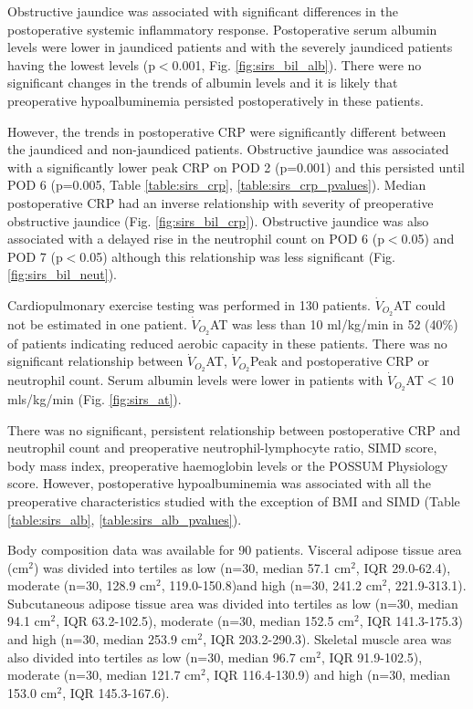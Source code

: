 Obstructive jaundice was associated with significant differences in the postoperative systemic inflammatory response. 
Postoperative serum albumin levels were lower in jaundiced patients and with the severely jaundiced patients having the lowest levels (p$<$0.001, Fig. \ref{fig:sirs_bil_alb}). 
There were no significant changes in the trends of albumin levels and it is likely that preoperative hypoalbuminemia persisted postoperatively in these patients. 

However, the trends in postoperative CRP were significantly different between the jaundiced and non-jaundiced patients. 
Obstructive jaundice was associated with a significantly lower peak CRP on POD 2 (p=0.001) and this persisted until POD 6 (p=0.005, Table \ref{table:sirs_crp}, \ref{table:sirs_crp_pvalues}).
Median postoperative CRP had an inverse relationship with severity of preoperative obstructive jaundice (Fig. \ref{fig:sirs_bil_crp}).
Obstructive jaundice was also associated with a delayed rise in the neutrophil count on POD 6 (p$<$0.05) and POD 7 (p$<$0.05) although this relationship was less significant (Fig. \ref{fig:sirs_bil_neut}). 

Cardiopulmonary exercise testing was performed in 130 patients. 
$\dot{V}_{O_2}$AT could not be estimated in one patient.
$\dot{V}_{O_2}$AT was less than 10 ml/kg/min in 52 (40\%) of patients indicating reduced aerobic capacity in these patients.
There was no significant relationship between $\dot{V}_{O_2}$AT, $\dot{V}_{O_2}$Peak and postoperative CRP or neutrophil count. 
Serum albumin levels were lower in patients with $\dot{V}_{O_2}$AT$<$10 mls/kg/min (Fig. \ref{fig:sirs_at}).

There was no significant, persistent relationship between postoperative CRP and neutrophil count and preoperative neutrophil-lymphocyte ratio, SIMD score, body mass index, preoperative haemoglobin levels or the POSSUM Physiology score. 
However, postoperative hypoalbuminemia was associated with all the preoperative characteristics studied with the exception of BMI and SIMD (Table \ref{table:sirs_alb}, \ref{table:sirs_alb_pvalues}).

Body composition data was available for 90 patients.
Visceral adipose tissue area (cm$^2$) was divided into tertiles as low (n=30, median 57.1 cm$^2$, IQR 29.0-62.4), moderate (n=30, 128.9 cm$^2$, 119.0-150.8)and high (n=30, 241.2 cm$^2$, 221.9-313.1). 
Subcutaneous adipose tissue area was divided into tertiles as low (n=30, median 94.1 cm$^2$, IQR 63.2-102.5), moderate (n=30, median 152.5 cm$^2$, IQR 141.3-175.3) and high (n=30, median 253.9 cm$^2$, IQR 203.2-290.3).
Skeletal muscle area was also divided into tertiles as low (n=30, median 96.7 cm$^2$, IQR 91.9-102.5), moderate (n=30, median 121.7 cm$^2$, IQR 116.4-130.9) and high (n=30, median 153.0 cm$^2$, IQR 145.3-167.6).

